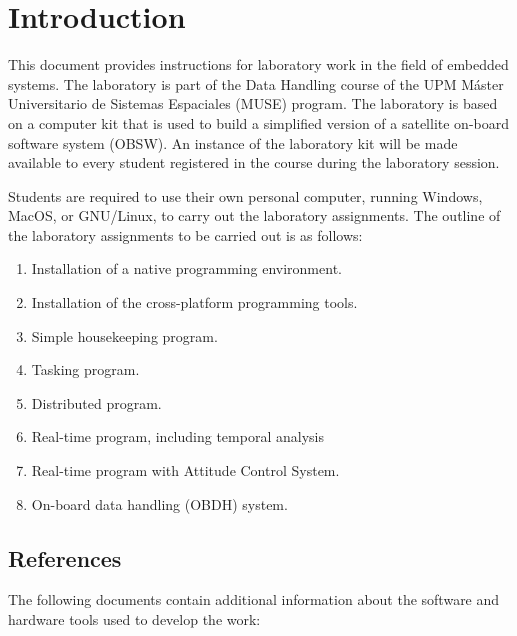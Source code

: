 \chapter*{Introduction}\label{ch:introduction}

This document provides instructions for laboratory work in the field of embedded systems. The laboratory is part of the Data Handling course of the UPM Máster Universitario de Sistemas Espaciales (MUSE) program.
The laboratory is based on a computer kit that is used to build a simplified version of a satellite on-board software system (OBSW). An instance of the laboratory kit will be made available to every student registered in the course during the laboratory session.

Students are required to use their own personal computer, running Windows, MacOS, or GNU/Linux, to carry out the laboratory assignments. 
The outline of the laboratory assignments to be carried out is as follows:
\begin{enumerate}
\item	Installation of a native programming environment.
\item	Installation of the cross-platform programming tools.
\item   Simple housekeeping program.
\item   Tasking program.
\item   Distributed program.
\item   Real-time program, including temporal analysis
\item	   Real-time program with Attitude Control System.
\item   On-board data handling (OBDH) system.
\end{enumerate}

\section*{References}

The following documents contain additional information about the software
and hardware tools used to develop the work:

